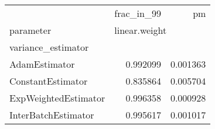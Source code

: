 \begin{tabular}{lrr}
\toprule
{} &    frac\_in\_99 &        pm \\
parameter & \multicolumn{2}{l}{linear.weight} \\
variance\_estimator   &               &           \\
\midrule
AdamEstimator        &      0.992099 &  0.001363 \\
ConstantEstimator    &      0.835864 &  0.005704 \\
ExpWeightedEstimator &      0.996358 &  0.000928 \\
InterBatchEstimator  &      0.995617 &  0.001017 \\
\bottomrule
\end{tabular}
